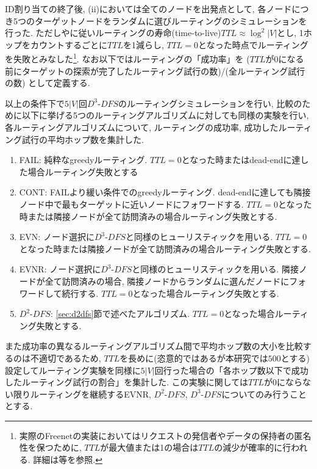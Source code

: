 \documentclass[dvipdfmx]{ampbt}
\begin{document}
  ID割り当ての終了後, (ii)においては全てのノードを出発点として, 各ノードにつき5つのターゲットノードをランダムに選びルーティングのシミュレーションを行った. ただし\cite{sandberg2006distributed}や\cite{schiller2011attack}に従いルーティングの寿命(time-to-live)$TTL\approx \log^2|V|$とし, 1ホップをカウントするごとに$TTL$を1減らし, $TTL=0$となった時点でルーティングを失敗とみなした\footnote{実際のFreenetの実装においてはリクエストの発信者やデータの保持者の匿名性を保つために, $TTL$が最大値または1の場合は$TTL$の減少が確率的に行われる. 詳細は\cite{roos2016analyzing}等を参照.}. なお以下ではルーティングの「成功率」を ($TTL$が0になる前にターゲットの探索が完了したルーティング試行の数)/(全ルーティング試行の数) として定義する.

  以上の条件下で$5|V|$回$D^3$-$DFS$のルーティングシミュレーションを行い, 比較のために以下に挙げる5つのルーティングアルゴリズムに対しても同様の実験を行い, 各ルーティングアルゴリズムについて, ルーティングの成功率, 成功したルーティング試行の平均ホップ数を集計した.

   \begin{enumerate}[label=(\alph*)]
    \item FAIL: 純粋なgreedyルーティング. $TTL=0$となった時またはdead-endに達した場合ルーティング失敗とする\cite{sandberg2006distributed}
    \item CONT: FAILより緩い条件でのgreedyルーティング. dead-endに達しても隣接ノード中で最もターゲットに近いノードにフォワードする. $TTL=0$となった時または隣接ノードが全て訪問済みの場合ルーティング失敗とする. \cite{sandberg2006distributed}
    \item EVN: ノード選択に$D^3$-$DFS$と同様のヒューリスティックを用いる. $TTL=0$となった時または隣接ノードが全て訪問済みの場合ルーティング失敗とする. 
    \item EVNR: ノード選択に$D^3$-$DFS$と同様のヒューリスティックを用いる. 隣接ノードが全て訪問済みの場合, 隣接ノードからランダムに選んだノードにフォワードして続行する. $TTL=0$となった場合ルーティング失敗とする. \cite{simsek2008navigating}
    \item $D^2$-$DFS$: \ref{sec:d2dfs}節で述べたアルゴリズム. $TTL=0$となった場合ルーティング失敗とする. 
   \end{enumerate}

  また成功率の異なるルーティングアルゴリズム間で平均ホップ数の大小を比較するのは不適切であるため, $TTL$を長めに(恣意的ではあるが本研究では$500$とする)設定してルーティング実験を同様に$5|V|$回行った場合の「各ホップ数以下で成功したルーティング試行の割合」を集計した. この実験に関しては$TTL$が0にならない限りルーティングを継続するEVNR, $D^2$-$DFS$, $D^3$-$DFS$についてのみ行うこととする. 
\end{document}

